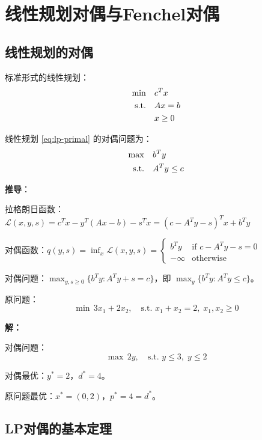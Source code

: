 \section{线性规划对偶与Fenchel对偶}\label{sec:lp-conjugate}

\subsection{线性规划的对偶}

标准形式的线性规划：
\begin{align}
\min \quad & c^T x \label{eq:lp-primal} \\
\text{s.t.} \quad & Ax = b \notag \\
& x \geq 0 \notag
\end{align}

\begin{theorem}[LP对偶]
线性规划 \eqref{eq:lp-primal} 的对偶问题为：
\begin{align}
\max \quad & b^T y \label{eq:lp-dual} \\
\text{s.t.} \quad & A^T y \leq c \notag
\end{align}
\end{theorem}

\textbf{推导}：

拉格朗日函数：$\mathcal{L}(x, y, s) = c^T x - y^T(Ax - b) - s^T x = (c - A^T y - s)^T x + b^T y$

对偶函数：$q(y, s) = \inf_{x} \mathcal{L}(x, y, s) = \begin{cases} b^T y & \text{if } c - A^T y - s = 0 \\ -\infty & \text{otherwise} \end{cases}$

对偶问题：$\max_{y, s \geq 0} \{b^T y : A^T y + s = c\}$，即 $\max_y \{b^T y : A^T y \leq c\}$。

\begin{example}[LP对偶]
原问题：
\[
\min \, 3x_1 + 2x_2, \quad \text{s.t. } x_1 + x_2 = 2, \; x_1, x_2 \geq 0
\]

\textbf{解：}

对偶问题：
\[
\max \, 2y, \quad \text{s.t. } y \leq 3, \; y \leq 2
\]

对偶最优：$y^* = 2$，$d^* = 4$。

原问题最优：$x^* = (0, 2)$，$p^* = 4 = d^*$。
\end{example}

\subsection{LP对偶的基本定理}

